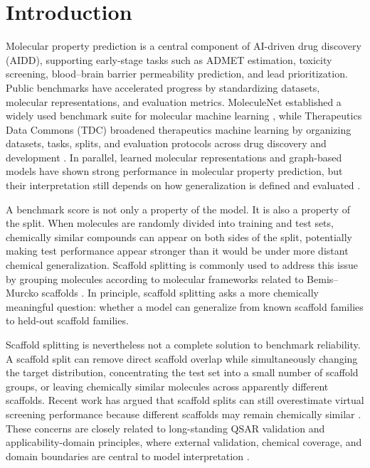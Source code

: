 \section{Introduction}

Molecular property prediction is a central component of AI-driven drug discovery (AIDD), supporting early-stage tasks such as ADMET estimation, toxicity screening, blood--brain barrier permeability prediction, and lead prioritization. Public benchmarks have accelerated progress by standardizing datasets, molecular representations, and evaluation metrics. MoleculeNet established a widely used benchmark suite for molecular machine learning \citep{wu2018moleculenet}, while Therapeutics Data Commons (TDC) broadened therapeutics machine learning by organizing datasets, tasks, splits, and evaluation protocols across drug discovery and development \citep{huang2021tdc}. In parallel, learned molecular representations and graph-based models have shown strong performance in molecular property prediction, but their interpretation still depends on how generalization is defined and evaluated \citep{feinberg2018potentialnet,yang2019learned}.

A benchmark score is not only a property of the model. It is also a property of the split. When molecules are randomly divided into training and test sets, chemically similar compounds can appear on both sides of the split, potentially making test performance appear stronger than it would be under more distant chemical generalization. Scaffold splitting is commonly used to address this issue by grouping molecules according to molecular frameworks related to Bemis--Murcko scaffolds \citep{bemis1996properties}. In principle, scaffold splitting asks a more chemically meaningful question: whether a model can generalize from known scaffold families to held-out scaffold families.

Scaffold splitting is nevertheless not a complete solution to benchmark reliability. A scaffold split can remove direct scaffold overlap while simultaneously changing the target distribution, concentrating the test set into a small number of scaffold groups, or leaving chemically similar molecules across apparently different scaffolds. Recent work has argued that scaffold splits can still overestimate virtual screening performance because different scaffolds may remain chemically similar \citep{guo2024scaffold}. These concerns are closely related to long-standing QSAR validation and applicability-domain principles, where external validation, chemical coverage, and domain boundaries are central to model interpretation \citep{tropsha2003earnest,gramatica2007principles,netzeva2005applicability,sahigara2012applicability}.

